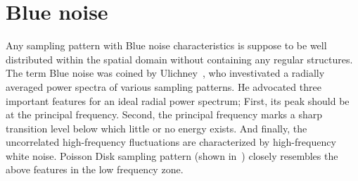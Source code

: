 %
\section{Blue noise}
Any sampling pattern with Blue noise characteristics is suppose to be well distributed within the spatial domain without containing any regular structures. The term Blue noise was coined by Ulichney~\cite{Ulichney:87:halftoning}, 
who investivated a radially averaged power spectra of various sampling patterns. 
He advocated three important features for an ideal radial power spectrum;  
First, its peak should be at the principal frequency. %
Second, the principal frequency marks a sharp transition level below which little or no energy exists. 
And finally, the uncorrelated high-frequency fluctuations are characterized by high-frequency white noise. Poisson Disk sampling pattern (shown in~) closely resembles 
the above features in the low frequency zone.

